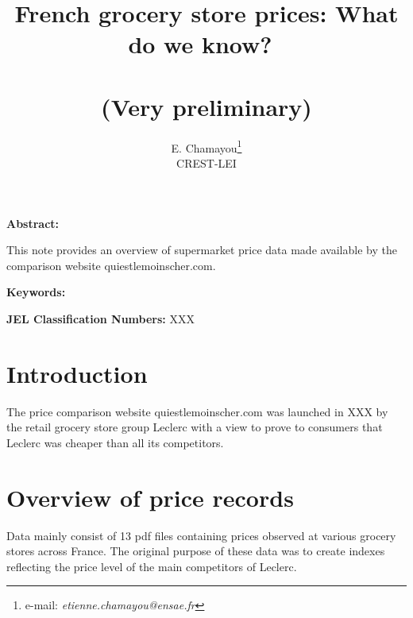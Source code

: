 \documentclass[11pt]{article}
\begin{document}
\title{French grocery store prices: What do we know?\ \\ \ \\(Very preliminary)}
\author{E. Chamayou\thanks{e-mail:
\textit{etienne.chamayou@ensae.fr}} \\ CREST-LEI}
\maketitle

\sloppy%

\onehalfspacing

\textbf{Abstract:}

This note provides an overview of supermarket price data made available by the comparison website quiestlemoinscher.com.

\strut

\textbf{Keywords:}

\strut

\textbf{JEL Classification Numbers:} XXX

\pagebreak%
\doublespacing

\section{Introduction}

The price comparison website quiestlemoinscher.com was launched in XXX by the retail grocery store group Leclerc with a view to prove to consumers that Leclerc was cheaper than all its competitors.

\section{Overview of price records}

Data mainly consist of 13 pdf files containing prices observed at various grocery stores across France. The original purpose of these data was to create indexes reflecting the price level of the main competitors of Leclerc.
\end{document}
